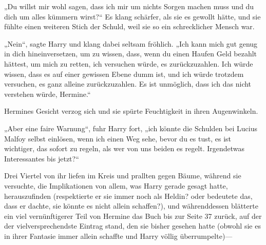 „Du willst mir wohl sagen, dass ich mir um nichts Sorgen machen muss und du dich um alles kümmern wirst?“
Es klang schärfer, als sie es gewollt hätte, und sie fühlte einen weiteren Stich der Schuld, weil sie so ein schrecklicher Mensch war.

„Nein“, sagte Harry und klang dabei seltsam fröhlich. „Ich kann mich gut genug in dich hineinversetzen, um zu wissen, dass, wenn du einen Haufen Geld bezahlt hättest, um mich zu retten, ich versuchen würde, es zurückzuzahlen. Ich würde wissen, dass es auf einer gewissen Ebene dumm ist, und ich würde trotzdem versuchen, es ganz alleine zurückzuzahlen. Es ist unmöglich, dass ich das nicht verstehen würde, Hermine.“

Hermines Gesicht verzog sich und sie spürte Feuchtigkeit in ihren Augenwinkeln.

„Aber eine faire Warnung“, fuhr Harry fort, „ich könnte die Schulden bei Lucius Malfoy selbst einlösen, wenn ich einen Weg sehe, bevor du es tust, es ist wichtiger, das sofort zu regeln, als wer von uns beiden es regelt. Irgendetwas Interessantes bis jetzt?“

Drei Viertel von ihr liefen im Kreis und prallten gegen Bäume, während sie versuchte, die Implikationen von allem, was Harry gerade gesagt hatte, herauszufinden (respektierte er sie immer noch als Heldin? oder bedeutete das, dass er dachte, sie könnte es nicht allein schaffen?), und währenddessen blätterte ein viel vernünftigerer Teil von Hermine das Buch bis zur Seite 37 zurück, auf der der vielversprechendste Eintrag stand, den sie bisher gesehen hatte (obwohl sie es in ihrer Fantasie immer allein schaffte und Harry völlig überrumpelte)—


